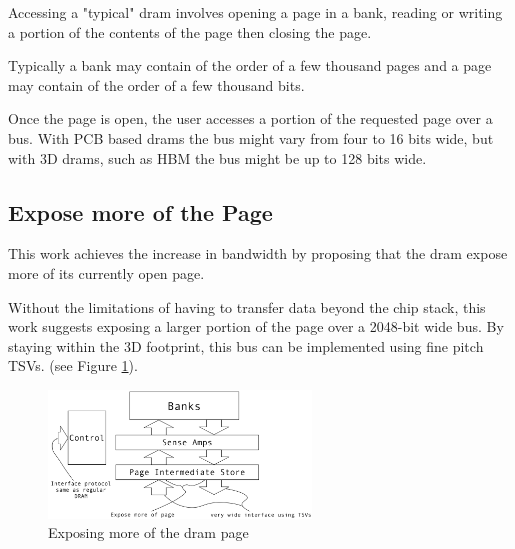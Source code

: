 \documentclass[journal]{IEEEtran}
\begin{document}
Accessing a "typical" \ac{dram} involves opening a page in a bank, reading or writing a portion of the contents of the page then closing the page.

Typically a bank may contain of the order of a few thousand pages and a page may contain of the order of a few thousand bits.

Once the page is open, the user accesses a portion of the requested page over a bus. With PCB based \ac{dram}s the bus might vary from four to 16 bits wide, but with 3D \ac{dram}s, such as HBM the bus might be up to 128 bits wide.

\subsection{Expose more of the Page}
\label{sec:exposeMorePage}

This work achieves the increase in bandwidth by proposing that the \ac{dram} expose more of its currently open page.

Without the limitations of having to transfer data beyond the chip stack, this work suggests exposing a larger portion of the page over a 2048-bit wide bus. By staying within the 3D footprint, this bus can be implemented using fine pitch TSVs.
(see Figure \ref{fig:DRAMBusChange}).

\begin{figure}[!t]
\centering
\captionsetup{justification=centering}
\captionsetup{width=.9\linewidth}
\centerline{
\mbox{\includegraphics[width=2.75in]{dramBusChange.jpg}}
}
\center\caption{Exposing more of the \ac{dram} page}
\label{fig:DRAMBusChange}
\end{figure}
\end{document}
